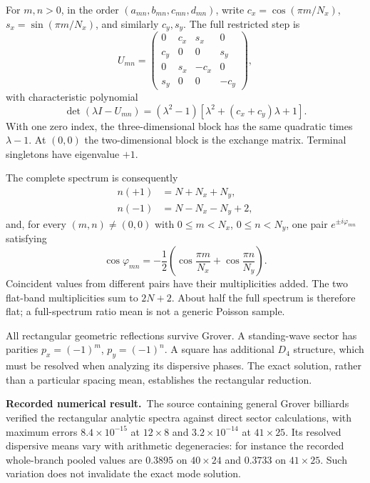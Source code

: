 \documentclass[11pt,a4paper,oneside]{report}
\newcommand{\Id}{I}
\newcommand{\recorded}{\textbf{Recorded numerical result.}\ }
\numberwithin{equation}{chapter}
\begin{document}
For \(m,n>0\), in the order \((a_{mn},b_{mn},c_{mn},d_{mn})\),
write \(c_x=\cos(\pi m/N_x)\), \(s_x=\sin(\pi m/N_x)\),
and similarly \(c_y,s_y\). The full restricted step is
\begin{equation}
U_{mn}=\begin{pmatrix}
0&c_x&s_x&0\\c_y&0&0&s_y\\0&s_x&-c_x&0\\s_y&0&0&-c_y
\end{pmatrix},
\end{equation}
with characteristic polynomial
\begin{equation}
\det(\lambda\Id-U_{mn})
=(\lambda^2-1)[\lambda^2+(c_x+c_y)\lambda+1].
\end{equation}
With one zero index, the three-dimensional block has the same
quadratic times \(\lambda-1\). At \((0,0)\) the two-dimensional
block is the exchange matrix. Terminal singletons have eigenvalue
\(+1\).

The complete spectrum is consequently
\begin{align}
n(+1)&=N+N_x+N_y,\\
n(-1)&=N-N_x-N_y+2,
\end{align}
and, for every \((m,n)\neq(0,0)\) with \(0\leq m<N_x\),
\(0\leq n<N_y\), one pair \(e^{\pm i\varphi_{mn}}\) satisfying
\begin{equation}
\boxed{
\cos\varphi_{mn}
=-\frac12\left(\cos\frac{\pi m}{N_x}+\cos\frac{\pi n}{N_y}\right).
}
\label{eq:groverspectrum}
\end{equation}
Coincident values from different pairs have their multiplicities added.
The two flat-band multiplicities sum to \(2N+2\). About half the
full spectrum is therefore flat; a full-spectrum ratio mean is not
a generic Poisson sample.

All rectangular geometric reflections survive Grover. A standing-wave
sector has parities \(p_x=(-1)^m\), \(p_y=(-1)^n\). A square has
additional \(D_4\) structure, which must be resolved when analyzing
its dispersive phases. The exact solution, rather than a particular
spacing mean, establishes the rectangular reduction.

\recorded The source containing general Grover billiards verified
the rectangular analytic spectra against direct sector calculations,
with maximum errors \(8.4\times10^{-15}\) at \(12\times8\) and
\(3.2\times10^{-14}\) at \(41\times25\). Its resolved dispersive
means vary with arithmetic degeneracies: for instance the recorded
whole-branch pooled values are \(0.3895\) on \(40\times24\) and
\(0.3733\) on \(41\times25\). Such variation does not invalidate
the exact mode solution.
\end{document}

